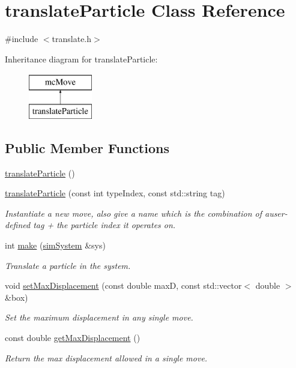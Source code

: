 \hypertarget{classtranslate_particle}{}\section{translate\+Particle Class Reference}
\label{classtranslate_particle}


{\ttfamily \#include $<$translate.\+h$>$}

Inheritance diagram for translate\+Particle\+:\begin{figure}[H]
\begin{center}
\leavevmode
\includegraphics[height=2.000000cm]{classtranslate_particle}
\end{center}
\end{figure}
\subsection*{Public Member Functions}
\begin{DoxyCompactItemize}
\item 
\hyperlink{classtranslate_particle_ac16b682a2119d7ebd6c7df75fa224ab4}{translate\+Particle} ()
\item 
\hyperlink{classtranslate_particle_aa9ffcde3ec4cbd82e939c7cb9ee85094}{translate\+Particle} (const int type\+Index, const std\+::string tag)
\begin{DoxyCompactList}\small\item\em Instantiate a new move, also give a name which is the combination of auser-\/defined tag + the particle index it operates on. \end{DoxyCompactList}\item 
int \hyperlink{classtranslate_particle_a7ec5c9259f1aae3f7aefdb4db3ee5468}{make} (\hyperlink{classsim_system}{sim\+System} \&sys)
\begin{DoxyCompactList}\small\item\em Translate a particle in the system. \end{DoxyCompactList}\item 
void \hyperlink{classtranslate_particle_a65beec2511e79198e6241ad2bc18b02c}{set\+Max\+Displacement} (const double max\+D, const std\+::vector$<$ double $>$ \&box)
\begin{DoxyCompactList}\small\item\em Set the maximum displacement in any single move. \end{DoxyCompactList}\item 
const double \hyperlink{classtranslate_particle_a5f1e76a0e8f20978b1c1069f698f89e6}{get\+Max\+Displacement} ()
\begin{DoxyCompactList}\small\item\em Return the max displacement allowed in a single move. \end{DoxyCompactList}\end{DoxyCompactItemize}
